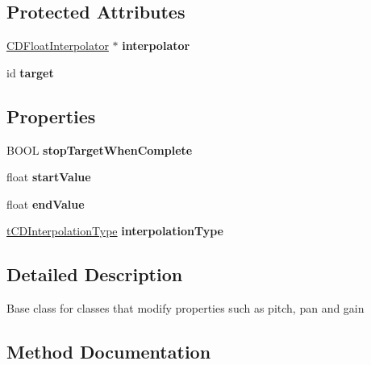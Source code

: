 \subsection*{Protected Attributes}
\begin{DoxyCompactItemize}
\item 
\mbox{\label{interfaceCDPropertyModifier_acdcfe6fe291b1ecdeb499184df3f374d}} 
\hyperlink{interfaceCDFloatInterpolator}{C\+D\+Float\+Interpolator} $\ast$ {\bfseries interpolator}
\item 
\mbox{\label{interfaceCDPropertyModifier_aef69ec3f2df7a26a7164ddc0f8a5006c}} 
id {\bfseries target}
\end{DoxyCompactItemize}
\subsection*{Properties}
\begin{DoxyCompactItemize}
\item 
\mbox{\label{interfaceCDPropertyModifier_a2bf99139e87f664206e7b136b8e5f358}} 
B\+O\+OL {\bfseries stop\+Target\+When\+Complete}
\item 
\mbox{\label{interfaceCDPropertyModifier_ad8f165bf19b08dd43cf941ecc40154fd}} 
float {\bfseries start\+Value}
\item 
\mbox{\label{interfaceCDPropertyModifier_a19c9dbbd4898b0ce15fd9d3eb4e38c59}} 
float {\bfseries end\+Value}
\item 
\mbox{\label{interfaceCDPropertyModifier_af453b40550152fcb2e7d355ff6314e6a}} 
\hyperlink{cocos2d_2cocos_2audio_2ios_2CocosDenshion_8h_abf5e3c49618c14630377c3696e7a3ab9}{t\+C\+D\+Interpolation\+Type} {\bfseries interpolation\+Type}
\end{DoxyCompactItemize}


\subsection{Detailed Description}
Base class for classes that modify properties such as pitch, pan and gain 

\subsection{Method Documentation}
\mbox{\label{interfaceCDPropertyModifier_a8c2d8d098bc743ad13d80271a03f15d6}} 
